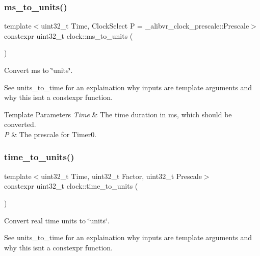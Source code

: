 \subsubsection{\texorpdfstring{ms\+\_\+to\+\_\+units()}{ms\_to\_units()}\hspace{0.1cm}{\footnotesize\ttfamily [2/2]}}
{\footnotesize\ttfamily template$<$uint32\+\_\+t Time, Clock\+Select P = \+\_\+alibvr\+\_\+clock\+\_\+prescale\+::\+Prescale$>$ \\
constexpr uint32\+\_\+t clock\+::ms\+\_\+to\+\_\+units (\begin{DoxyParamCaption}{ }\end{DoxyParamCaption})\hspace{0.3cm}{\ttfamily [inline]}}



Convert ms to \char`\"{}units\char`\"{}. 

See units\+\_\+to\+\_\+time for an explaination why inputs are template arguments and why this isn\textquotesingle{}t a constexpr function.


\begin{DoxyTemplParams}{Template Parameters}
{\em Time} & The time duration in ms, which should be converted. \\
\hline
{\em P} & The prescale for {\ttfamily Timer0}. \\
\hline
\end{DoxyTemplParams}
\hypertarget{namespaceclock_ac6b5f264784ea96fd8629fec0c0f7131}{}\label{namespaceclock_ac6b5f264784ea96fd8629fec0c0f7131} 
\subsubsection{\texorpdfstring{time\+\_\+to\+\_\+units()}{time\_to\_units()}\hspace{0.1cm}{\footnotesize\ttfamily [1/2]}}
{\footnotesize\ttfamily template$<$uint32\+\_\+t Time, uint32\+\_\+t Factor, uint32\+\_\+t Prescale$>$ \\
constexpr uint32\+\_\+t clock\+::time\+\_\+to\+\_\+units (\begin{DoxyParamCaption}{ }\end{DoxyParamCaption})}



Convert real time units to \char`\"{}units\char`\"{}. 

See units\+\_\+to\+\_\+time for an explaination why inputs are template arguments and why this isn\textquotesingle{}t a constexpr function.

